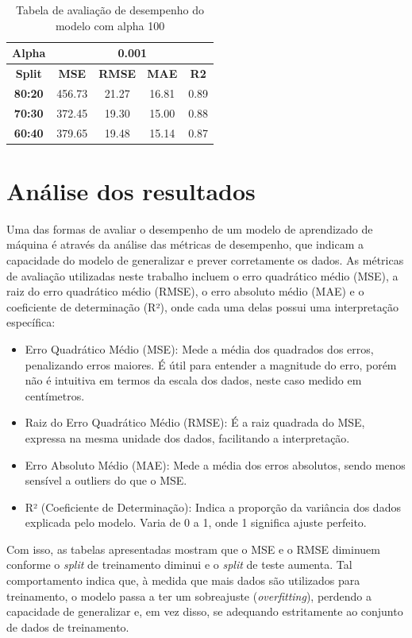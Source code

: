 \begin{table}[H]
\centering
\begin{tabular}{|c|c|c|c|c|}
\hline
\textbf{Alpha} & \multicolumn{4}{|c|}{\textbf{0.001}} \\
\hline
\textbf{Split} & \textbf{MSE} & \textbf{RMSE} & \textbf{MAE} & \textbf{R2} \\
\hline
\textbf{80:20} & 456.73 & 21.27 & 16.81 & 0.89 \\
\textbf{70:30} & 372.45 & 19.30 & 15.00 & 0.88 \\
\textbf{60:40} & 379.65 & 19.48 & 15.14 & 0.87 \\
\hline
\end{tabular}
\caption{Tabela de avaliação de desempenho do modelo com alpha 100}
\end{table}


\chapter{Análise dos resultados}

Uma das formas de avaliar o desempenho de um modelo de aprendizado de máquina é através da análise das métricas de desempenho, que indicam a capacidade do modelo de generalizar e prever corretamente os dados. As métricas de avaliação utilizadas neste trabalho incluem o erro quadrático médio (MSE), a raiz do erro quadrático médio (RMSE), o erro absoluto médio (MAE) e o coeficiente de determinação (R²), onde cada uma delas possui uma interpretação específica:

\begin{itemize}
	\item Erro Quadrático Médio (MSE): Mede a média dos quadrados dos erros, penalizando erros maiores. É útil para entender a magnitude do erro, porém não é intuitiva em termos da escala dos dados, neste caso medido em centímetros.
	\item Raiz do Erro Quadrático Médio (RMSE): É a raiz quadrada do MSE, expressa na mesma unidade dos dados, facilitando a interpretação.
	\item Erro Absoluto Médio (MAE): Mede a média dos erros absolutos, sendo menos sensível a outliers do que o MSE.
	\item R² (Coeficiente de Determinação): Indica a proporção da variância dos dados explicada pelo modelo. Varia de 0 a 1, onde 1 significa ajuste perfeito.
\end{itemize}

Com isso, as tabelas apresentadas mostram que o MSE e o RMSE diminuem conforme o \textit{split} de treinamento diminui e o \textit{split} de teste aumenta. Tal comportamento indica que, à medida que mais dados são utilizados para treinamento, o modelo passa a ter um sobreajuste (\textit{overfitting}), perdendo a capacidade de generalizar e, em vez disso, se adequando estritamente ao conjunto de dados de treinamento.

